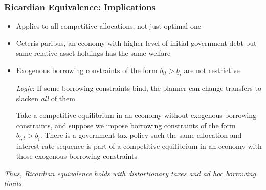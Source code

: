 \documentclass{beamer}
\begin{document}
%
%
%
%

\begin{frame}
 \frametitle{Ricardian Equivalence: Implications}
 \begin{itemize}
 \item Applies to all competitive allocations, not just optimal one
 \item Ceteris paribus, an economy with higher level of initial government debt  but same relative asset holdings has the same welfare
 \item Exogenous borrowing constraints of the form $b_{it}>\underline{b}_i$ are not restrictive

 \emph{Logic}: If some borrowing constraints bind, the planner can change transfers to  slacken   \emph{all}  of them
 \small
\begin{theorem}
Take a competitive
equilibrium  in an economy without
exogenous borrowing constraints, and suppose we impose borrowing constraints of the form $b_{i,t}>\underbar{b}_i$.  There is a government tax policy such the same allocation and interest rate sequence is  part of a competitive equilibrium
in an economy with those exogenous borrowing constraints
\end{theorem}
\end{itemize}
\normalsize
  \color{red}\emph{Thus, Ricardian equivalence holds with distortionary taxes and ad hoc borrowing limits}

\end{frame}
\end{document}
